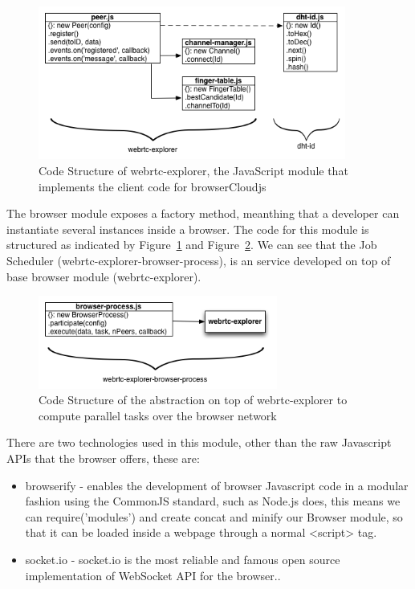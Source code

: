 \begin{figure}[h!]
  \centering
  \includegraphics[width=0.9\textwidth]{figs/diagram-webrtc-explorer}
  \caption{Code Structure of webrtc-explorer, the JavaScript module that implements the client code for browserCloudjs}
  \label{fig:d-w-e}
\end{figure}

The browser module exposes a factory method, meanthing that a developer can instantiate several instances inside a browser. The code for this module is structured as indicated by Figure~\ref{fig:d-w-e} and Figure~\ref{fig:d-w-e-b-p}. We can see that the Job Scheduler (webrtc-explorer-browser-process), is an service developed on top of base browser module (webrtc-explorer).

\begin{figure}[h!]
  \centering
  \includegraphics[width=0.7\textwidth]{figs/diagram-webrtc-explorer-browser-process}
  \caption{Code Structure of the abstraction on top of webrtc-explorer to compute parallel tasks over the browser network}
  \label{fig:d-w-e-b-p}
\end{figure}

There are two technologies used in this module, other than the raw Javascript APIs that the browser offers, these are:

\begin{itemize}
    \item browserify - enables the development of browser Javascript code in a modular fashion using the CommonJS standard, such as Node.js does, this means we can require('modules') and create concat and minify our Browser module, so that it can be loaded inside a webpage through a normal <script> tag.
    \item socket.io - socket.io is the most reliable and famous open source implementation of WebSocket API for the browser..
\end{itemize}

